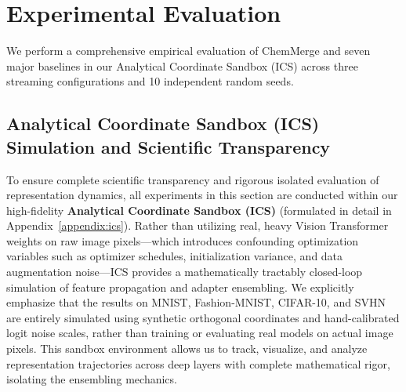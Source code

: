 \section{Experimental Evaluation}
\label{sec:experiments}

\noindent{}
\vskip 0.1in

We perform a comprehensive empirical evaluation of ChemMerge and seven major baselines in our Analytical Coordinate Sandbox (ICS) across three streaming configurations and 10 independent random seeds.

\subsection{Analytical Coordinate Sandbox (ICS) Simulation and Scientific Transparency}
To ensure complete scientific transparency and rigorous isolated evaluation of representation dynamics, all experiments in this section are conducted within our high-fidelity \textbf{Analytical Coordinate Sandbox (ICS)} (formulated in detail in Appendix~\ref{appendix:ics}). Rather than utilizing real, heavy Vision Transformer weights on raw image pixels---which introduces confounding optimization variables such as optimizer schedules, initialization variance, and data augmentation noise---ICS provides a mathematically tractably closed-loop simulation of feature propagation and adapter ensembling. We explicitly emphasize that the results on MNIST, Fashion-MNIST, CIFAR-10, and SVHN are entirely simulated using synthetic orthogonal coordinates and hand-calibrated logit noise scales, rather than training or evaluating real models on actual image pixels. This sandbox environment allows us to track, visualize, and analyze representation trajectories across deep layers with complete mathematical rigor, isolating the ensembling mechanics.

